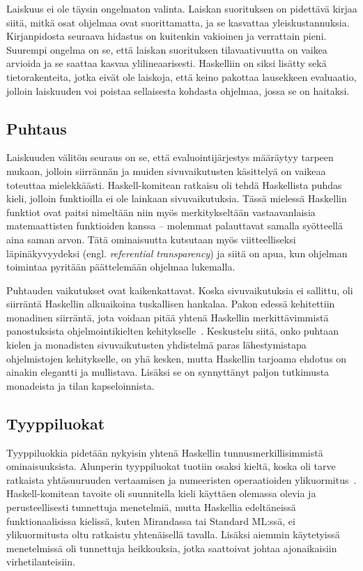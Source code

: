 \documentclass[finnish]{tktltiki2}
\begin{document}
Laiskuus ei ole täysin ongelmaton valinta. Laiskan suorituksen on pidettävä kirjaa siitä, mitkä osat
ohjelmaa ovat suorittamatta, ja se kasvattaa yleiskustannuksia. Kirjanpidosta seuraava hidastus on
kuitenkin vakioinen ja verrattain pieni. Suurempi ongelma on se, että laiskan suorituksen
tilavaativuutta on vaikea arvioida ja se saattaa kasvaa ylilineaarisesti. Haskelliin on siksi
lisätty sekä tietorakenteita, jotka eivät ole laiskoja, että keino pakottaa lausekkeen evaluaatio,
jolloin laiskuuden voi poistaa sellaisesta kohdasta ohjelmaa, jossa se on haitaksi.

\subsection{Puhtaus}

Laiskuuden välitön seuraus on se, että evaluointijärjestys määräytyy tarpeen mukaan, jolloin
siirrännän ja muiden sivuvaikutusten käsittelyä on vaikeaa toteuttaa mielekkäästi. Haskell-komitean
ratkaisu oli tehdä Haskellista puhdas kieli, jolloin funktioilla ei ole lainkaan sivuvaikutuksia.
Tässä mielessä Haskellin funktiot ovat paitsi nimeltään niin myös merkitykseltään vastaavanlaisia
matemaattisten funktioiden kanssa -- molemmat palauttavat samalla syötteellä aina saman arvon. Tätä
ominaisuutta kutsutaan myös viitteelliseksi läpinäkyvyydeksi (engl. \emph{referential transparency})
ja siitä on apua, kun ohjelman toimintaa pyritään päättelemään ohjelmaa lukemalla.

Puhtauden vaikutukset ovat kaikenkattavat. Koska sivuvaikutuksia ei sallittu, oli siirräntä
Haskellin alkuaikoina tuskallisen hankalaa. Pakon edessä kehitettiin monadinen siirräntä, jota
voidaan pitää yhtenä Haskellin merkittävimmistä panostuksista ohjelmointikielten
kehitykselle~\cite{hoh07}. Keskustelu siitä, onko puhtaan kielen ja monadisten sivuvaikutusten
yhdistelmä paras lähestymistapa ohjelmistojen kehitykselle, on yhä kesken, mutta Haskellin tarjoama
ehdotus on ainakin elegantti ja mullistava. Lisäksi se on synnyttänyt paljon tutkimusta monadeista
ja tilan kapseloinnista.

\subsection{Tyyppiluokat}

Tyyppiluokkia pidetään nykyisin yhtenä Haskellin tunnusmerkillisimmistä ominaisuuksista. Alunperin
tyyppiluokat tuotiin osaksi kieltä, koska oli tarve ratkaista yhtäsuuruuden vertaamisen ja
numeeristen operaatioiden ylikuormitus~\cite{hoh07}. Haskell-komitean tavoite oli suunnitella kieli
käyttäen olemassa olevia ja perusteellisesti tunnettuja menetelmiä, mutta Haskellia edeltäneissä
funktionaalisissa kielissä, kuten Mirandassa tai Standard ML:ssä, ei ylikuormitusta oltu ratkaistu
yhtenäisellä tavalla. Lisäksi aiemmin käytetyissä menetelmissä oli tunnettuja heikkouksia, jotka
saattoivat johtaa ajonaikaisiin virhetilanteisiin.
\end{document}
